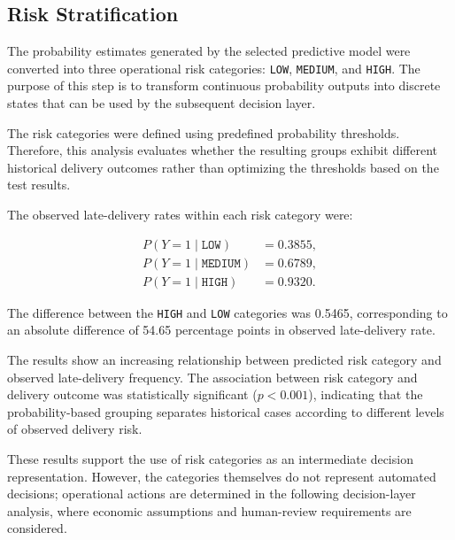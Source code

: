 \documentclass[10pt,a4paper]{article}
\begin{document}
\FloatBarrier

\subsection{Risk Stratification}

The probability estimates generated by the selected predictive model
were converted into three operational risk categories:
\texttt{LOW}, \texttt{MEDIUM}, and \texttt{HIGH}. The purpose of this
step is to transform continuous probability outputs into discrete states
that can be used by the subsequent decision layer.

The risk categories were defined using predefined probability thresholds.
Therefore, this analysis evaluates whether the resulting groups exhibit
different historical delivery outcomes rather than optimizing the
thresholds based on the test results.

The observed late-delivery rates within each risk category were:

\begin{equation}
\begin{aligned}
P(Y=1\mid \texttt{LOW}) &= 0.3855,\\
P(Y=1\mid \texttt{MEDIUM}) &= 0.6789,\\
P(Y=1\mid \texttt{HIGH}) &= 0.9320.
\end{aligned}
\end{equation}

The difference between the \texttt{HIGH} and \texttt{LOW} categories
was 0.5465, corresponding to an absolute difference of 54.65 percentage
points in observed late-delivery rate.

The results show an increasing relationship between predicted risk
category and observed late-delivery frequency. The association between
risk category and delivery outcome was statistically significant
($p<0.001$), indicating that the probability-based grouping separates
historical cases according to different levels of observed delivery
risk.

These results support the use of risk categories as an intermediate
decision representation. However, the categories themselves do not
represent automated decisions; operational actions are determined in
the following decision-layer analysis, where economic assumptions and
human-review requirements are considered.
\end{document}

